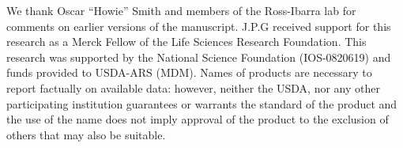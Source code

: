 \documentclass[twocolumn,twoside,letterpaper]{article}
\begin{document}
\begin{acknowledgments}
We thank Oscar ``Howie'' Smith and members of the Ross-Ibarra lab for comments on earlier versions of the manuscript. J.P.G received support for this research as a Merck Fellow of the Life Sciences Research Foundation. This research was supported by the National Science Foundation (IOS-0820619) and funds provided to USDA-ARS (MDM). Names of products are necessary to report factually on available data: however, neither the USDA, nor any other participating institution guarantees or warrants the standard of the product and the use of the name does not imply approval of the product to the exclusion of others that may also be suitable.
\end{acknowledgments}




\suppl
 
\end{document}
